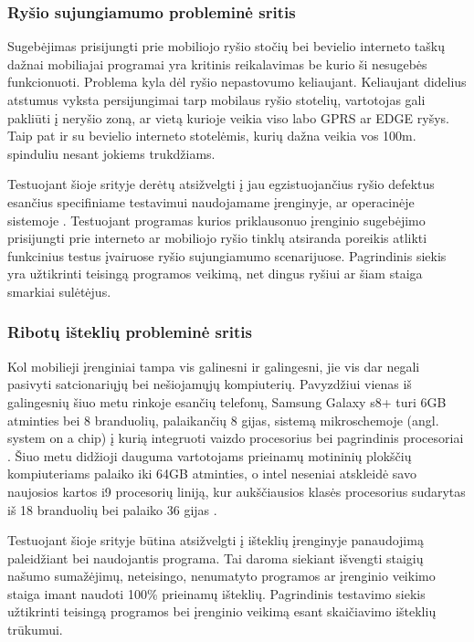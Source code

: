 \documentclass{VUMIFPSkursinis}
\begin{document}
\subsubsection{Ryšio sujungiamumo probleminė sritis}
Sugebėjimas prisijungti prie mobiliojo ryšio stočių bei bevielio interneto taškų dažnai mobiliajai programai yra kritinis reikalavimas be kurio ši nesugebės funkcionuoti. Problema kyla dėl ryšio nepastovumo keliaujant. Keliaujant didelius atstumus vyksta persijungimai tarp mobilaus ryšio stotelių, vartotojas gali pakliūti į neryšio zoną, ar vietą kurioje veikia viso labo GPRS ar EDGE ryšys. Taip pat ir su bevielio interneto stotelėmis, kurių dažna veikia vos 100m. spinduliu nesant jokiems trukdžiams. 

Testuojant šioje srityje derėtų atsižvelgti į jau egzistuojančius ryšio defektus esančius specifiniame testavimui naudojamame įrenginyje, ar operacinėje sistemoje \cite{android_bugs}. Testuojant programas kurios priklausonuo įrenginio sugebėjimo prisijungti prie interneto ar mobiliojo ryšio tinklų atsiranda poreikis atlikti funkcinius testus įvairuose ryšio sujungiamumo scenarijuose. Pagrindinis siekis yra užtikrinti teisingą programos veikimą, net dingus ryšiui ar šiam staiga smarkiai sulėtėjus.

\subsubsection{Ribotų išteklių probleminė sritis}
Kol mobilieji įrenginiai tampa vis galinesni ir galingesni, jie vis dar negali pasivyti satcionariųjų bei nešiojamųjų kompiuterių. Pavyzdžiui vienas iš galingesnių šiuo metu rinkoje esančių telefonų, Samsung Galaxy s8+ turi 6GB atminties bei 8 branduolių, palaikančių 8 gijas, sistemą mikroschemoje (angl. system on a chip) į kurią integruoti vaizdo procesorius bei pagrindinis procesoriai \cite{samsung_s8}. Šiuo metu didžioji dauguma vartotojams prieinamų motininių plokščių kompiuteriams palaiko iki 64GB atminties, o intel neseniai atskleidė savo naujosios kartos i9 procesorių liniją, kur aukščiausios klasės procesorius sudarytas iš 18 branduolių bei palaiko 36 gijas \cite{intel_i9}.

Testuojant šioje srityje būtina atsižvelgti į išteklių įrenginyje panaudojimą paleidžiant bei naudojantis programa. Tai daroma siekiant išvengti staigių našumo sumažėjimų, neteisingo, nenumatyto programos ar įrenginio veikimo staiga imant naudoti 100\% prieinamų išteklių. Pagrindinis testavimo siekis užtikrinti teisingą programos bei įrenginio veikimą esant skaičiavimo išteklių trūkumui.
\end{document}
